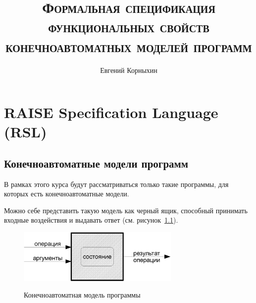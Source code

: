 \documentclass[14pt, twoside]{extreport}
\author{Евгений Корныхин}
\title{\huge{\textbf{\textsc{Формальная спецификация функциональных свойств конечноавтоматных моделей программ}}}}
\begin{document}
\maketitle

\tableofcontents





\chapter{RAISE Specification Language (RSL)}

\section{Конечноавтоматные модели программ}

В рамках этого курса будут рассматриваться только такие программы, для которых есть конечноавтоматные модели.

Можно себе представить такую модель как черный ящик, способный принимать входные воздействия и выдавать ответ (см. рисунок~\ref{fig:machine}).

\begin{figure}[h] \center
  \includegraphics[width=0.7\textwidth]{rsl/machine}\\
  \caption{Конечноавтоматная модель программы}\label{fig:machine}
\end{figure}
\end{document}

